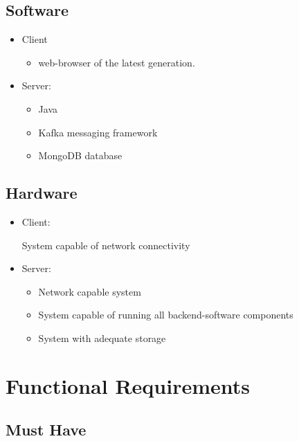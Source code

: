 \documentclass[twoside, english, draft]{Pflichtenheft}
\begin{document}
\subsection{Software}
\begin{itemize}
\item{Client}
\begin{itemize}
	\item{web-browser of the latest generation.}
\end{itemize}
	
\item{Server:}
\begin{itemize}
	\item{Java}
	\item{Kafka messaging framework}
	\item{MongoDB database}
\end{itemize}
\end{itemize}
	
\subsection{Hardware}
\begin{itemize}
\item{Client:}
\begin{itemize}
	System capable of network connectivity
\end{itemize}
	
\item{Server:}
\begin{itemize}
	\item{Network capable system}
	\item{System capable of running all backend-software components}
	\item{System with adequate storage}
\end{itemize}

\end{itemize}

\section{Functional Requirements}
\subsection{Must Have}
\end{document}
